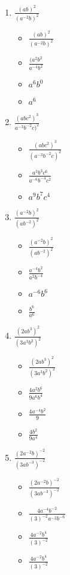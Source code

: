 \begin{enumerate}
\item {\Large $\frac{(ab)^{2}}{(a^{-2}b)^{2}}$}
  \begin{itemize}
  \item {\Large $\frac{(ab)^{2}}{(a^{-2}b)^{2}}$}
  \item {\Large $\frac{(a^{2}b^{2}}{a^{-4}b^{2}}$}
  \item $a^{6}b^{0}$
  \item $a^{6}$
  \end{itemize}
\item {\Large $\frac{(abc^{2})^{3}}{a^{-3}b^{-2}c)^{2}}$}
  \begin{itemize}
  \item {\Large $\frac{(abc^{2})^{3}}{(a^{-3}b^{-2}c)^{2}}$}
  \item {\Large $\frac{a^{3}b^{3}c^{6}}{a^{-6}b^{-4}c^{2}}$}
  \item  $a^{9}b^{7}c^{4}$
  \end{itemize}
\item {\Large $\frac{(a^{-2}b)^{2}}{(ab^{-2})^{2}}$}
  \begin{itemize}
  \item {\Large $\frac{(a^{-2}b)^{2}}{(ab^{-2})^{2}}$}
  \item {\Large $\frac{a^{-4}b^{2}}{a^{2}b^{-4}}$}
  \item $a^{-6}b^{6}$
  \item {\Large $\frac{b^{6}}{a^{6}}$}
  \end{itemize}
\item {\Large $\frac{(2ab^{3})^{2}}{(3a^{3}b^{2})^{2}}$}
  \begin{itemize}
  \item {\Large $\frac{(2ab^{3})^{2}}{(3a^{3}b^{2})^{2}}$}
  \item {\Large $\frac{4a^{2}b^{6}}{9a^{6}b^{4}}$}
  \item {\Large $\frac{4a^{-4}b^{2}}{9}$}
  \item {\Large $\frac{4b^{2}}{9a^{4}}$}
  \end{itemize}
\item {\Large $\frac{(2a^{-2}b)^{-2}}{(3ab^{-3})^{-2}}$}
  \begin{itemize}
  \item {\Large $\frac{(2a^{-2}b)^{-2}}{(3ab^{-3})^{-2}}$}
  \item {\Large $\frac{4a^{-4}b^{-2}}{(3)^{-2}a^{-2}b^{-6}}$}
  \item {\Large $\frac{4a^{-2}b^{4}}{(3)^{-2}}$}
  \item {\Large $\frac{4a^{-2}b^{4}}{(3)^{-2}}$}

\end{itemize}
\end{enumerate}
